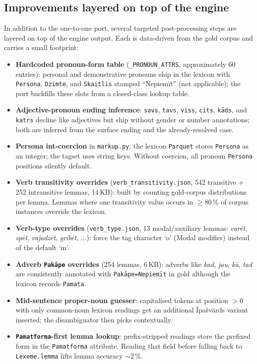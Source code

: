 \documentclass[11pt,a4paper]{article}
\begin{document}
\subsection{Improvements layered on top of the engine}

In addition to the one-to-one port, several targeted post-processing
steps are layered on top of the engine output. Each is data-driven
from the gold corpus and carries a small footprint:

\begin{itemize}
\item \textbf{Hardcoded pronoun-form table} (\verb|_PRONOUN_ATTRS|,
  approximately 60 entries): personal and demonstrative pronouns ship
  in the lexicon with \verb|Persona|, \verb|Dzimte|, and
  \verb|Skaitlis| stamped ``Nepiemīt'' (not applicable); the port
  backfills these slots from a closed-class lookup table.
\item \textbf{Adjective-pronoun ending inference}: \texttt{savs},
  \texttt{tavs}, \texttt{viss}, \texttt{cits}, \texttt{kāds}, and
  \texttt{katrs} decline like adjectives but ship without gender or
  number annotations; both are inferred from the surface ending and
  the already-resolved case.
\item \textbf{Persona int-coercion} in \texttt{markup.py}: the lexicon
  \texttt{Parquet} stores \texttt{Persona} as an integer; the tagset uses
  string keys. Without coercion, all pronoun \texttt{Persona} positions
  silently default.
\item \textbf{Verb transitivity overrides} (\texttt{verb\_transitivity.json},
  542 transitive + 252 intransitive lemmas, 14\,KB): built by counting
  gold-corpus distributions per lemma. Lemmas where one transitivity value
  occurs in $\geq$80\,\% of corpus instances override the lexicon.
\item \textbf{Verb-type overrides} (\texttt{verb\_type.json}, 13 modal/auxiliary
  lemmas: \textit{varēt}, \textit{spēt}, \textit{vajadzēt}, \textit{gribēt},
  $\dots$): force the tag character `o' (Modal modifier) instead of the
  default `m'.
\item \textbf{Adverb \texttt{Pakāpe} overrides} (254 lemmas, 6\,KB): adverbs
  like \textit{kad}, \textit{jau}, \textit{kā}, \textit{tad} are consistently
  annotated with \texttt{Pakāpe=Nepiemīt} in gold although the lexicon
  records \texttt{Pamata}.
\item \textbf{Mid-sentence proper-noun guesser}: capitalised tokens at
  position $>0$ with only common-noun lexicon readings get an additional
  Īpašvārds variant inserted; the disambiguator then picks contextually.
\item \textbf{\texttt{Pamatforma}-first lemma lookup}: prefix-stripped readings
  store the prefixed form in the \texttt{Pamatforma} attribute. Reading that
  field before falling back to \texttt{Lexeme.lemma} lifts lemma accuracy
  $\sim$2\,\%.
\end{itemize}
\end{document}
